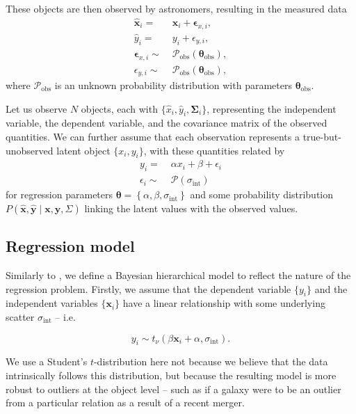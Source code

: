 \documentclass[fleqn,usenatbib]{mnras}
\newcommand{\studentt}[2]{t_\nu \left( #1, #2 \right)}
\newcommand{\depvar}{y_i}
\newcommand{\indepvars}{\boldsymbol{x}_i}
\newcommand{\intscttr}{\sigma_{\text{int}}}
\newcommand{\intercept}{\alpha}
\newcommand{\covariate}{\beta}
\begin{document}
These objects are then observed by astronomers, resulting in the measured
data
\begin{align}
    \hat{\boldsymbol{x}}_i =&\; \boldsymbol{x}_i + \boldsymbol{\epsilon}_{x,i}, \\
    \hat{y}_i =&\; y_i + \epsilon_{y,i}, \\
    \boldsymbol{\epsilon}_{x,i} \sim&\; \mathcal{P}_{\text{obs}} \left( \boldsymbol{\theta}_{\text{obs}} \right), \\
    \epsilon_{y,i} \sim&\; \mathcal{P}_{\text{obs}} \left( \boldsymbol{\theta}_{\text{obs}} \right),
\end{align}
where $\mathcal{P}_{\text{obs}}$ is an unknown probability distribution with
parameters $\boldsymbol{\theta}_{\text{obs}}$.

Let us observe $N$ objects, each with $\{\hat{x}_i, \hat{y}_i,
\boldsymbol{\Sigma}_i\}$, representing the independent variable, the dependent
variable, and the covariance matrix of the observed quantities.  We can further
assume that each observation represents a true-but-unobserved latent object
$\{x_i, y_i\}$, with these quantities related by
\begin{align}
    y_i =&\; \alpha x_i + \beta + \epsilon_i \\
    \epsilon_i \sim&\; \mathcal{P} \left( \sigma_{\text{int}} \right)
\end{align}
for regression parameters $\boldsymbol{\theta} = \left\{\alpha, \beta,
\sigma_{\mathrm{int}}\right\}$ and some probability distribution $P\left(
\hat{\mathbf{x}}, \hat{\mathbf{y}} \mid \mathbf{x}, \mathbf{y}, \Sigma \right)$
linking the latent values with the observed values.

\subsection{Regression model}
\label{sec:formalism.model}

Similarly to \citet{Kelly:2007}, we define a Bayesian hierarchical model to
reflect the nature of the regression problem. Firstly, we assume that the
dependent variable $\{\depvar\}$ and the independent variables $\{\indepvars\}$
have a linear relationship with some underlying scatter $\intscttr$ -- i.e.

\begin{equation}
\depvar \sim \studentt{\covariate \indepvars + \intercept}{\intscttr}.
\end{equation}

We use a Student's $t$-distribution here not because we believe that the data
intrinsically follows this distribution, but because the resulting model is more
robust to outliers at the object level -- such as if a galaxy were to be an
outlier from a particular relation as a result of a recent merger.
\end{document}
